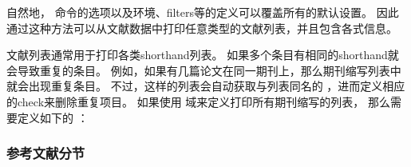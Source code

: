 \begin{ltxsyntax}
\begin{ltxexample}
\end{ltxexample}


自然地， 命令的选项以及环境、filters等的定义可以覆盖所有的默认设置。
因此通过这种方法可以从文献数据中打印任意类型的文献列表，并且包含各式信息。
\end{ltxsyntax}


文献列表通常用于打印各类shorthand列表。
如果多个条目有相同的shorthand就会导致重复的条目。
例如，如果有几篇论文在同一期刊上，那么期刊缩写列表中就会出现重复条目。
不过，这样的列表会自动获取与列表同名的 ，进而定义相应的check来删除重复项目。
如果使用  域来定义打印所有期刊缩写的列表，
那么需要定义如下的 ：

\begin{ltxexample}
\end{ltxexample}

\subsubsection{参考文献分节}%
\label{use:bib:sec}


